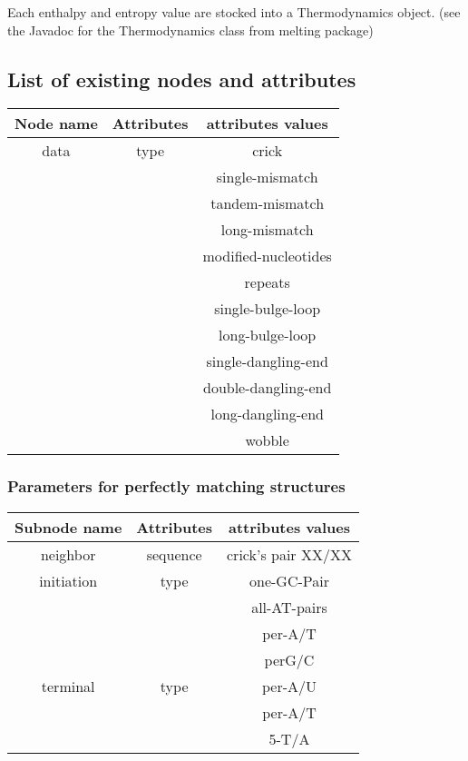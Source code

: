 \documentclass{article}
\begin{document}
Each enthalpy and entropy value are stocked into a Thermodynamics object. (see the Javadoc for the
Thermodynamics class from melting package)

\subsection{List of existing nodes and attributes}

\begin{table}[hc]
\begin{tabular}[h]{| c | c | c |}
\textbf{Node name} & \textbf{Attributes} & \textbf{attributes values} \\
 \hline
data & type & crick \\
 & & single-mismatch \\
 & & tandem-mismatch \\
 & & long-mismatch \\
 & & modified-nucleotides \\
 & & repeats \\
 & & single-bulge-loop \\
 & & long-bulge-loop \\
 & & single-dangling-end \\
 & & double-dangling-end \\
 & & long-dangling-end \\
 & & wobble \\
  \hline
\end{tabular}
\end{table}

\subsubsection{Parameters for perfectly matching structures}

\begin{table}[hc]
\begin{tabular}[h]{| c | c | c |}
\textbf{Subnode name} & \textbf{Attributes} & \textbf{attributes values} \\
 \hline
neighbor & sequence & crick's pair XX/XX \\
 \hline
initiation & type & one-GC-Pair \\
 & & all-AT-pairs \\
 & & per-A/T \\
 & & perG/C \\
  \hline
terminal & type & per-A/U \\
 & & per-A/T \\
 & & 5-T/A \\
  \hline
\end{tabular}
\end{table}
\end{document}
